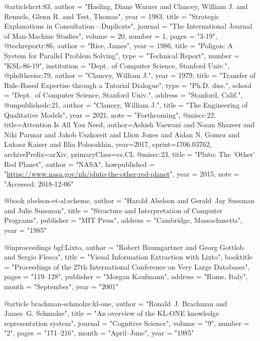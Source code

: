 @article{hcrt:83,
  author  = "Hasling, Diane Warner and Clancey, William J. and Rennels, Glenn R. and Test, Thomas",
  year    = 1983,
  title   = "{Strategic Explanations in Consultation---Duplicate}",
  journal = "The International Journal of Man-Machine Studies",
  volume  = 20,
  number  = 1,
  pages   = "3-19",
}
@techreport{r:86,
  author  = "Rice, James",
  year    = 1986,
  title   = "{Poligon: A System for Parallel Problem Solving}",
  type    = "Technical Report",
  number  = "KSL-86-19",
  institution = "Dept.\ of Computer Science, Stanford Univ.",
}
@phdthesis{c:79,
  author  = "Clancey, William J.",
  year    = 1979,
  title   = "{Transfer of Rule-Based Expertise
through a Tutorial Dialogue}",
  type    = "{Ph.D.} diss.",
  school  = "Dept.\ of Computer Science, Stanford Univ.",
  address = "Stanford, Calif.",
}
@unpublished{c:21,
  author  = "Clancey, William J.",
  title   = "{The Engineering of Qualitative Models}",
  year    = 2021,
  note    = "Forthcoming",
}
@misc{c:22,
      title={Attention Is All You Need},
      author={Ashish Vaswani and Noam Shazeer and Niki Parmar and Jakob Uszkoreit and Llion Jones and Aidan N. Gomez and Lukasz Kaiser and Illia Polosukhin},
      year={2017},
      eprint={1706.03762},
      archivePrefix={arXiv},
      primaryClass={cs.CL}
}
@misc{c:23,
  title        = "Pluto: The 'Other' Red Planet",
  author       = "{NASA}",
  howpublished = "\url{https://www.nasa.gov/nh/pluto-the-other-red-planet}",
  year         = 2015,
  note         = "Accessed: 2018-12-06"
}

@book{ abelson-et-al:scheme,
  author = "Harold Abelson and Gerald~Jay Sussman and Julie Sussman",
  title = "Structure and Interpretation of Computer Programs",
  publisher = "MIT Press",
  address = "Cambridge, Massachusetts",
  year = "1985"
}

@inproceedings{ bgf:Lixto,
  author = "Robert Baumgartner and Georg Gottlob and Sergio Flesca",
  title = "Visual Information Extraction with {Lixto}",
  booktitle = "Proceedings of the 27th International Conference on Very Large Databases",
  pages = "119--128",
  publisher = "Morgan Kaufmann",
  address = "Rome, Italy",
  month = "September",
  year = "2001"
}

@article{ brachman-schmolze:kl-one,
  author = "Ronald~J. Brachman and James~G. Schmolze",
  title = "An overview of the {KL-ONE} knowledge representation system",
  journal = "Cognitive Science",
  volume = "9",
  number = "2",
  pages = "171--216",
  month = "April--June",
  year = "1985"
}

